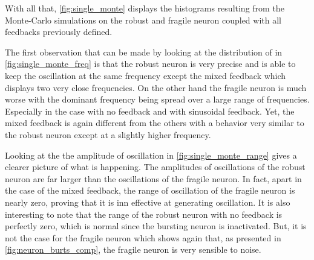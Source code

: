 With all that, \cref{fig:single_monte} displays the histograms resulting from the Monte-Carlo simulations on the robust and fragile neuron coupled with all feedbacks previously defined. 

The first observation that can be made by looking at the distribution of in \cref{fig:single_monte_freq} is that the robust neuron is very precise and is able to keep the oscillation at the same frequency except the mixed feedback which displays two very close frequencies. 
On the other hand the fragile neuron is much worse with the dominant frequency being spread over a large range of frequencies. 
Especially in the case with no feedback and with sinusoidal feedback. 
Yet, the mixed feedback is again different from the others with a behavior very similar to the robust neuron except at a slightly higher frequency.

Looking at the the amplitude of oscillation in \cref{fig:single_monte_range} gives a clearer picture of what is happening. 
The amplitudes of oscillations of the robust neuron are far larger than the oscillations of the fragile neuron. 
In fact, apart in the case of the mixed feedback, the range of oscillation of the fragile neuron is nearly zero, proving that it is inn effective at generating oscillation. 
It is also interesting to note that the range of the robust neuron with no feedback is perfectly zero, which is normal since the bursting neuron is inactivated. 
But, it is not the case for the fragile neuron which shows again that, as presented in \cref{fig:neuron_burts_comp}, the fragile neuron is very sensible to noise.

